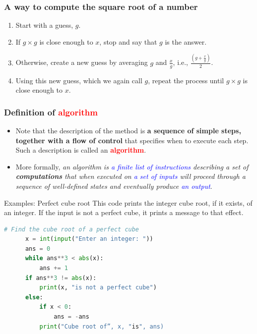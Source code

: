 \documentclass{sintefbeamer}
\begin{document}
\begin{frame}
  \frametitle{A way to compute the square root of a number}

  \pause

  \begin{enumerate}
    \item Start with a guess, $g$.
    \item If $g \times g$ is close enough to $x$, stop and say that $g$ is the answer.
    \item Otherwise, create a new guess by averaging $g$ and $\frac{x}{g}$, i.e., $\frac{(g + \frac{x}{g})}{2}$.
    \item Using this new guess, which we again call $g$, repeat the process until $g \times g$ is close enough to $x$.
  \end{enumerate}

\end{frame}

\begin{frame}
  \frametitle{Definition of \textcolor{red}{algorithm}}

  \begin{itemize}[<+->]
    \item Note that the description of the method is \textbf{a sequence of simple steps, together with a flow of control} that specifies when to execute each step. Such a description is called an \textcolor{red}{\textbf{algorithm}}.\\[5pt]
    \item More formally, \textit{an algorithm is \textcolor{blue}{a finite list of instructions} describing a set of \textbf{computations} that when executed on \textcolor{blue}{a set of inputs} will proceed through a sequence of well-defined states and eventually produce \textcolor{blue}{an output}}.
  \end{itemize}

\end{frame}

\begin{frame}[fragile]{Examples: Perfect cube root}
  This code prints the integer cube root, if it exists, of an integer. If the input is not a perfect cube, it prints a message to that effect.

  \begin{block}{}
    \begin{lstlisting}[language=Python]
      # Find the cube root of a perfect cube
      x = int(input("Enter an integer: "))
      ans = 0
      while ans**3 < abs(x):
          ans += 1
      if ans**3 != abs(x):
          print(x, "is not a perfect cube")
      else:
          if x < 0:
              ans = -ans
          print("Cube root of”, x, "is", ans)
    \end{lstlisting}
  \end{block}
\end{frame}
\end{document}
